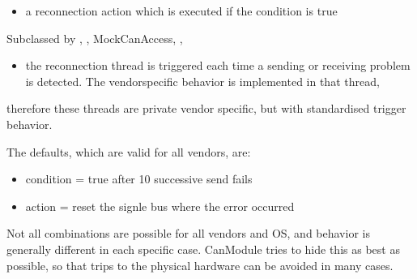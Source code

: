 \documentclass[a4paper,10pt,english]{sphinxmanual}
\begin{document}
\begin{itemize}
\item {} 
\sphinxAtStartPar
a reconnection action which is executed if the condition is true

\end{itemize}

\begin{fulllineitems}
%
\pysigstartmultiline
{}%
\pysigstopmultiline
\sphinxAtStartPar
Subclassed by {\hyperref[\detokenize{classestracing:classAnaCanScan}]{}}, {\hyperref[\detokenize{vendors/systec:classCSockCanScan}]{}}, MockCanAccess, {\hyperref[\detokenize{vendors/peak:classPKCanScan}]{}}, {\hyperref[\detokenize{classestracing:classSTCanScan}]{}}

\end{fulllineitems}

\begin{itemize}
\item {} 
\sphinxAtStartPar
the reconnection thread is triggered each time a sending or receiving problem is detected. The vendor\sphinxhyphen{}specific behavior is implemented in that thread,

\end{itemize}

\sphinxAtStartPar
therefore these threads are private vendor specific, but with standardised trigger behavior.

\sphinxAtStartPar
The defaults, which are valid for all vendors, are:
\begin{itemize}
\item {} 
\sphinxAtStartPar
condition = true after 10 successive send fails

\item {} 
\sphinxAtStartPar
action =  reset the signle bus where the error occurred

\end{itemize}

\sphinxAtStartPar
Not all combinations are possible for all vendors and OS, and behavior is generally
different in each specific case. CanModule tries to hide this as best as possible, so that
trips to the physical hardware can be avoided in many cases.
\end{document}
